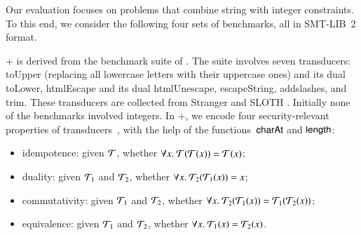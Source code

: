 %
%
% 

Our evaluation focuses on problems that combine string with integer constraints.  To this end, we consider the following four sets of
benchmarks, all in SMT-LIB~2 format.

\smallskip
\noindent \transducerbench+
is derived from the {\transducerbench} benchmark suite of {\ostrich}
\cite{CHL+19}.  The {\transducerbench} suite involves seven
transducers: 
%
%
toUpper (replacing all lowercase letters with their
uppercase ones) and its dual toLower, htmlEscape   and
its dual htmlUnescape, escapeString, addslashes, and trim. 
%
These transducers are
collected from Stranger \cite{YABI14} and SLOTH
\cite{HJLRV18}. Initially none of the benchmarks involved integers. In
{\transducerbench+}, we encode four security-relevant properties of
transducers~\cite{BEK}, with the help of the functions~$\mathsf{charAt}$ and
$\mathsf{length}$:
\begin{itemize}
\item idempotence: given $\mathcal{T}$, whether
  $\forall x.\ \mathcal{T}(\mathcal{T}(x)) = \mathcal{T}(x)$;
\item duality: given $\mathcal{T}_1$ and
  $\mathcal{T}_2$, whether $\forall x.\ \mathcal{T}_2(\mathcal{T}_1(x)) = x$;
\item commutativity: given $\mathcal{T}_1$ and $\mathcal{T}_2$, whether
  $\forall x.\ \mathcal{T}_2(\mathcal{T}_1(x)) = \mathcal{T}_1(\mathcal{T}_2(x))$;
\item equivalence: given $\mathcal{T}_1$ and $\mathcal{T}_2$, whether
  $\forall x.\ \mathcal{T}_1(x) = \mathcal{T}_2(x)$.
\end{itemize}

